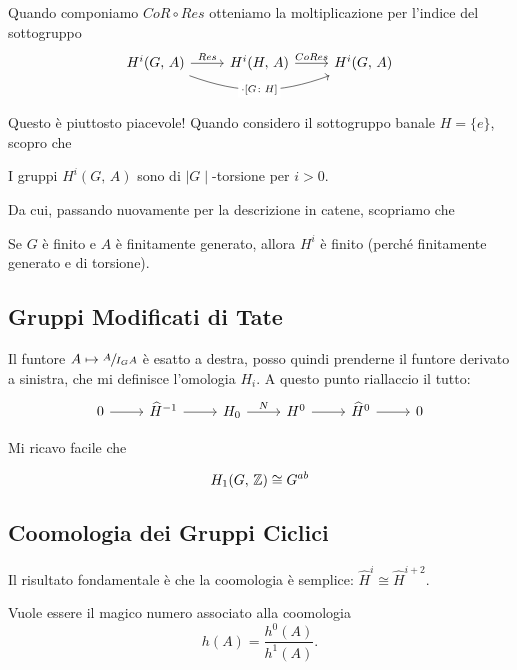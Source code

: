 \documentclass[a4paper]{article}
\begin{document}
	\begin{theorem}
		Quando componiamo $ CoR \circ Res $ otteniamo la moltiplicazione per l'indice del sottogruppo
		\[ \begin{tikzcd}
		H^i(G, \, A) \rar["Res"] \arrow["\cdot {\left[G \colon H \right]}" description, bend right = 20]{rr} & H^i(H, \, A)\rar["CoRes"] & H^i(G, \, A)
		\end{tikzcd} \]
	\end{theorem}

	Questo è piuttosto piacevole! Quando considero il sottogruppo banale $ H = \{ e \} $, scopro che
	
	\begin{theorem}
		I gruppi $ H^i(G, \, A) $ sono di $ \mid G \mid  $-torsione per $ i > 0. $
	\end{theorem}

	Da cui, passando nuovamente per la descrizione in catene, scopriamo che
	\begin{theorem}
		Se $ G $ è finito e $ A $ è finitamente generato, allora $ H^i $ è finito (perché finitamente generato e di torsione).
	\end{theorem}

	\subsection{Gruppi Modificati di Tate}
	Il funtore $ A \mapsto \sfrac{A}{I_GA} $  è esatto a destra, posso quindi prenderne il funtore derivato a sinistra, che mi definisce l'omologia $ H_i. $ A questo punto riallaccio il tutto:
	\[ \begin{tikzcd}
	0 \rar &  \widehat{H}^{-1} \rar & H_0 \rar["N"] & H^0 \rar & \widehat{H}^0 \rar & 0
	\end{tikzcd} \]
	
	Mi ricavo facile che
	\begin{theorem}
		\[ H_1(G, \, \mathbb{Z}) \cong G^{ab} \]
	\end{theorem}

	\subsection{Coomologia dei Gruppi Ciclici}
	Il risultato fondamentale è che la coomologia è semplice: $ \widehat{H}^i \cong \widehat{H}^{i+2} $.
	
	\begin{definition}
		Vuole essere il magico numero associato alla coomologia
		\[ h(A) = \frac{h^0(A)}{h^1(A)}. \]
	\end{definition}	
\end{document}
